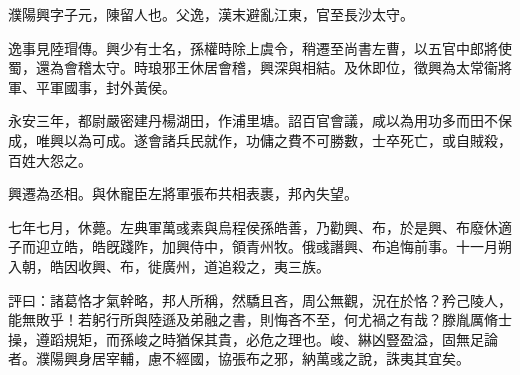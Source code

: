 
\begin{pinyinscope}
濮陽興字子元，陳留人也。父逸，漢末避亂江東，官至長沙太守。

逸事見陸瑁傳。興少有士名，孫權時除上虞令，稍遷至尚書左曹，以五官中郎將使蜀，還為會稽太守。時琅邪王休居會稽，興深與相結。及休即位，徵興為太常衞將軍、平軍國事，封外黃侯。

永安三年，都尉嚴密建丹楊湖田，作浦里塘。詔百官會議，咸以為用功多而田不保成，唯興以為可成。遂會諸兵民就作，功傭之費不可勝數，士卒死亡，或自賊殺，百姓大怨之。

興遷為丞相。與休寵臣左將軍張布共相表裹，邦內失望。

七年七月，休薨。左典軍萬彧素與烏程侯孫皓善，乃勸興、布，於是興、布廢休適子而迎立皓，皓旣踐阼，加興侍中，領青州牧。俄彧譖興、布追悔前事。十一月朔入朝，皓因收興、布，徙廣州，道追殺之，夷三族。

評曰：諸葛恪才氣幹略，邦人所稱，然驕且吝，周公無觀，況在於恪？矜己陵人，能無敗乎！若躬行所與陸遜及弟融之書，則悔吝不至，何尤禍之有哉？滕胤厲脩士操，遵蹈規矩，而孫峻之時猶保其貴，必危之理也。峻、綝凶豎盈溢，固無足論者。濮陽興身居宰輔，慮不經國，協張布之邪，納萬彧之說，誅夷其宜矣。


\end{pinyinscope}